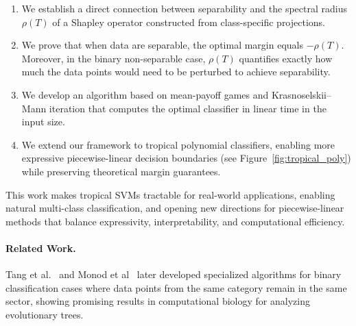 \documentclass{article}
\begin{document}
\begin{enumerate}
    \item We establish a direct connection between separability and the spectral radius $\rho(T)$ of a Shapley operator constructed from class-specific projections.
    
    \item We prove that when data are separable, the optimal margin equals $-\rho(T)$. Moreover, in the binary non-separable case, $\rho(T)$ quantifies exactly how much the data points would need to be perturbed to achieve separability.
    
    \item We develop an algorithm based on mean-payoff games and Krasnoselskii--Mann iteration that computes the optimal classifier in linear time in the input size.
    
    \item We extend our framework to tropical polynomial classifiers, enabling more expressive piecewise-linear decision boundaries (see Figure~\ref{fig:tropical_poly}) while preserving theoretical margin guarantees.
\end{enumerate}

This work makes tropical SVMs tractable for real-world applications, enabling natural multi-class classification, and opening new directions for piecewise-linear methods that balance expressivity, interpretability, and computational efficiency.

\paragraph{Related Work.}
Tang et al.~\cite{tang2020} and Monod et al~\cite{monod2022} later developed specialized algorithms for binary classification cases where data points from the same category remain in the same sector, showing promising results in computational biology for analyzing evolutionary trees.

\end{document}
